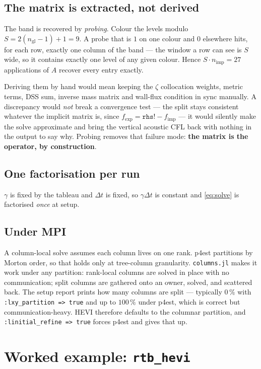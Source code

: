 \documentclass[11pt,a4paper]{article}
\newcommand{\fexp}{f_{\mathrm{exp}}}
\newcommand{\fimp}{f_{\mathrm{imp}}}
\begin{document}
\subsection{The matrix is extracted, not derived}
The band is recovered by \emph{probing}. Colour the levels modulo
$S=2(n_{\mathrm{gl}}-1)+1=9$. A probe that is $1$ on one colour and $0$
elsewhere hits, for each row, exactly one column of the band --- the window a
row can see is $S$ wide, so it contains exactly one level of any given colour.
Hence $S\cdot n_{\mathrm{imp}}=27$ applications of $A$ recover every entry
exactly.

Deriving them by hand would mean keeping the $\zeta$ collocation weights,
metric terms, DSS sum, inverse mass matrix and wall-flux condition in sync
manually. A discrepancy would \emph{not} break a convergence test --- the split
stays consistent whatever the implicit matrix is, since
$\fexp=\texttt{rhs!}-\fimp$ --- it would silently make the solve approximate and
bring the vertical acoustic CFL back with nothing in the output to say why.
Probing removes that failure mode: \textbf{the matrix is the operator, by
construction}.

\subsection{One factorisation per run}
$\gamma$ is fixed by the tableau and $\Delta t$ is fixed, so $\gamma\Delta t$ is
constant and \eqref{eq:solve} is factorised \emph{once} at setup.

\subsection{Under MPI}
A column-local solve assumes each column lives on one rank. p4est partitions by
Morton order, so that holds only at tree-column granularity.
\texttt{columns.jl} makes it work under any partition: rank-local columns are
solved in place with no communication; split columns are gathered onto an
owner, solved, and scattered back. The setup report prints how many columns are
split --- typically $0\,\%$ with \texttt{:lxy\_partition => true} and up to
$100\,\%$ under p4est, which is correct but communication-heavy. HEVI therefore
defaults to the columnar partition, and \texttt{:linitial\_refine => true}
forces p4est and gives that up.

\section{Worked example: \texttt{rtb\_hevi}}
\end{document}
